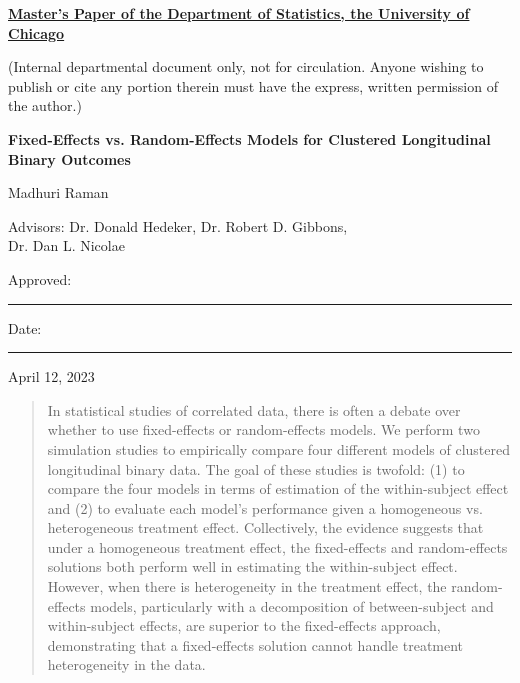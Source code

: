 \documentclass{article}
\begin{document}
\begin{titlepage}
    \begin{center}
       \vspace{0cm}
       \hspace{0cm}
       \textbf{\underline{Master’s Paper of the Department of Statistics, the University of Chicago}}
    
        
       \vspace{0.25cm}
        (Internal departmental document only, not for circulation. Anyone wishing to publish or cite any portion therein must have the express, written permission of the author.)
            
       \vspace{3cm}
    
       \Huge{\textbf{Fixed-Effects vs. Random-Effects Models for Clustered Longitudinal Binary Outcomes}}
       
       \vspace{3cm}
       \huge{Madhuri Raman}

       \vspace{3cm}

       
       \LARGE{Advisors: Dr. Donald Hedeker, Dr. Robert D. Gibbons, \\ Dr. Dan L. Nicolae}
  
       \vspace{2cm}

        \LARGE{Approved:}  
        \rule{9cm}{0.15mm} 
        \vspace{0.1cm}
        \newline
        
        \vspace{0.1cm}
        \LARGE{Date:}
        \rule{10cm}{0.15mm}

        \vspace{1cm}
        \LARGE{April 12, 2023}
 
        
   \end{center}
\end{titlepage}

\begin{abstract}

    In statistical studies of correlated data, there is often a debate over whether to use fixed-effects or random-effects models. We perform two simulation studies to empirically compare four different models of clustered longitudinal binary data. The goal of these studies is twofold: (1) to compare the four models in terms of estimation of the within-subject effect and (2) to evaluate each model's performance given a homogeneous vs. heterogeneous treatment effect. Collectively, the evidence suggests that under a homogeneous treatment effect, the fixed-effects and random-effects solutions both perform well in estimating the within-subject effect. However, when there is heterogeneity in the treatment effect, the random-effects models, particularly with a decomposition of between-subject and within-subject effects, are superior to the fixed-effects approach, demonstrating that a fixed-effects solution cannot handle treatment heterogeneity in the data.  
\end{abstract}
\end{document}

